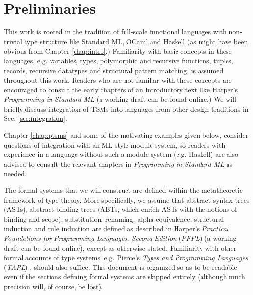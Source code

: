 
\section{Preliminaries}\label{sec:preliminaries}
This work is rooted in the tradition of full-scale functional languages with non-trivial type structure like Standard ML, OCaml and Haskell (as might have been obvious from Chapter \ref{chap:intro}.) Familiarity with basic concepts in these languages, e.g. variables, types, polymorphic and recursive functions, tuples, records, recursive datatypes and structural pattern matching, is assumed throughout this work. Readers who are not familiar with these concepts are encouraged to consult the early chapters of an introductory text like Harper's \emph{Programming in Standard ML} \cite{harper1997programming} (a working draft can be found online.) We will briefly discuss integration of TSMs into languages from other design traditions in Sec. \ref{sec:integration}.

Chapter \ref{chap:ptsms} and some of the motivating examples given below, consider questions of integration with an ML-style module system, so readers with experience in a language without such a module system (e.g. Haskell) are also advised to consult the relevant chapters in \emph{Programming in Standard ML} \cite{harper1997programming} as needed.

The formal systems that we will construct are defined within the metatheoretic framework of type theory. More specifically, we assume that abstract syntax trees (ASTs), abstract binding trees (ABTs, which enrich ASTs with the notions of binding and scope), substitution, renaming, alpha-equivalence, structural induction and rule induction are defined as described in Harper's \emph{Practical Foundations for Programming Languages, Second Edition} (\emph{PFPL}) \cite{pfpl} (a working draft can be found online), except as otherwise stated. Familiarity with other formal accounts of type systems, e.g. Pierce's \emph{Types and Programming Languages} (\emph{TAPL}) \cite{tapl}, should also suffice. This document is organized so as to be readable even if the sections defining formal systems are skipped entirely (although much precision will, of course, be lost).

